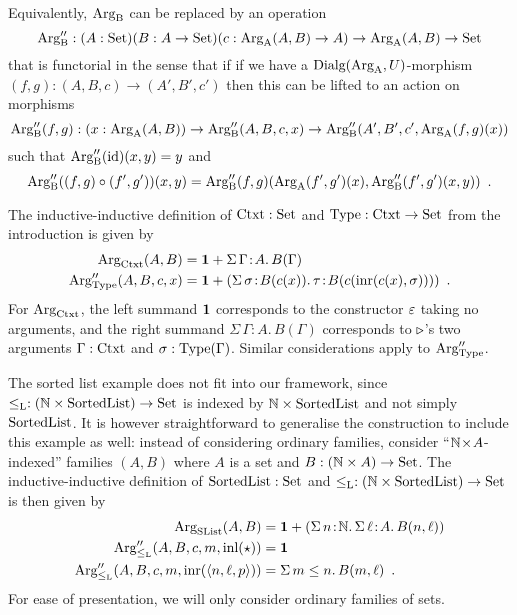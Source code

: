 \documentclass[orivec,envcountsame, ,envcountsect]{llncs}
\begin{document}
\begin{lemma}
Equivalently, $\text{Arg}_{\text{B}}$ can be replaced by an operation
\[
\text{Arg}_{\text{B}}'' : (A : \text{Set})(B : A \to \text{Set})(c : \text{Arg}_{\text{A}}(A, B) \to A) \to \text{Arg}_{\text{A}}(A, B) \to \text{Set}
\]
that is functorial in the sense that if if we have a
$\text{Dialg}(\text{Arg}_{\text{A}}, U)$-morphism $(f, g) : (A, B, c) \to (A', B',
c')$ then this can be lifted to an action on morphisms
 \[\text{Arg}_{\text{B}}''(f, g) : (x : \text{Arg}_{\text{A}}(A, B)) \to \text{Arg}_{\text{B}}''(A, B,
   c, x) \to \text{Arg}_{\text{B}}''(A', B', c', \text{Arg}_{\text{A}}(f, g)(x))
\]
such that $\text{Arg}_{\text{B}}''(\text{id})(x, y) = y$ and
\[
\text{Arg}_{\text{B}}''((f, g) \circ (f', g'))(x, y) =\text{Arg}_{\text{B}}''(f, g)(\text{Arg}_{\text{A}}(f', g')(x), \text{Arg}_{\text{B}}''(f',g')(x, y)) \enspace .
\]
\end{lemma}


\begin{example}
\label{ex:ctxtTy-functor}
The inductive-inductive definition of $\text{Ctxt} : \text{Set}$ and $\text{Type} :
\text{Ctxt} \to \text{Set}$ from the introduction is given by
\begin{align*}
  \text{Arg}_{\text{Ctxt}}(A, B) &= \mathbf{1} + \Sigma\, \Gamma\!:\!A .\, B(\Gamma)\\
  \text{Arg}_{\text{Type}}''(A, B, c, x) &= \mathbf{1} + (\Sigma\,  \sigma\!:\! B(c(x)).\, \tau\!:\!B(c(\text{inr}(c(x), \sigma))) ) \enspace .
\end{align*}
For $\text{Arg}_{\text{Ctxt}}$, the left summand $\mathbf{1}$ corresponds to the constructor
$\varepsilon$ taking no arguments, and the right summand $\Sigma\,
\Gamma\!:\!A .\, B(\Gamma)$ corresponds to $ \triangleright $'s two
arguments $\Gamma : \text{Ctxt}$ and $\sigma : \text{Type}(\Gamma)$. Similar
considerations apply to $\text{Arg}_{\text{Type}}''$.

\end{example}

\begin{example}
\label{ex:SList-functor}
The sorted list example does not fit into our framework, since
$\leq_{\text{L}} : (\mathbb{N} \times \text{SortedList}) \to \text{Set}$ is indexed by $\mathbb{N}
\times \text{SortedList}$ and not simply $\text{SortedList}$. It is however
straightforward to generalise the construction to include this example
as well: instead of considering ordinary families, consider
``${\mathbb{N}\!\times\!A }$-indexed'' families $(A, B)$ where $A$ is a set
and $B : (\mathbb{N} \times A) \to \text{Set}$.  The inductive-inductive
definition of $\text{SortedList} : \text{Set}$ and $\leq_{\text{L}} : (\mathbb{N} \times
\text{SortedList}) \to \text{Set}$ is then given by
\begin{align*}
  \text{Arg}_{\text{SList}}(A, B) &= \mathbf{1} + (\Sigma\, n\!:\!\mathbb{N} .\,\Sigma\,\ell\!:\!A.\, B(n,\ell))\\
  \text{Arg}_{\leq_{\text{L}}}''(A, B, c, m, \text{inl}(\star)) &= \mathbf{1} \\
  \text{Arg}_{\leq_{\text{L}}}''(A, B, c, m, \text{inr}(\langle n, \ell, p\rangle)) &= \Sigma\,m \leq n.\, B(m, \ell) \enspace .
\end{align*}
For ease of presentation, we will only consider ordinary families of
sets.

\end{example}
\end{document}
